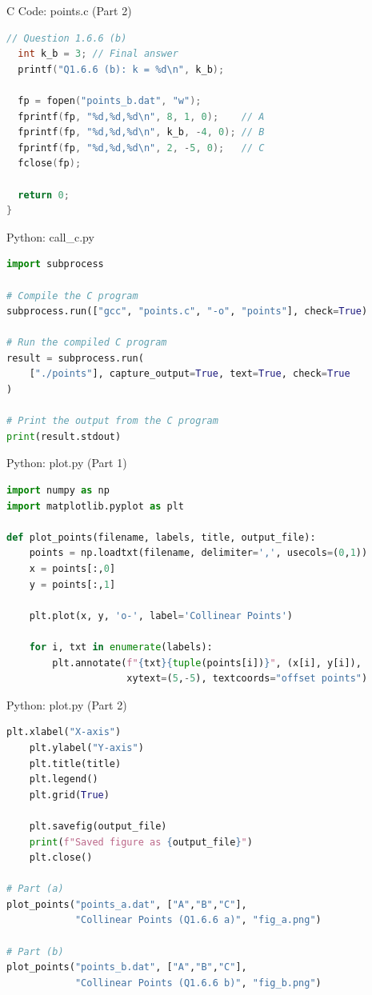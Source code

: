 \documentclass{beamer}
\numberwithin{equation}{section}
\theoremstyle{remark}
\begin{document}
\begin{frame}[fragile]{C Code: points.c (Part 2)}
\begin{lstlisting}[language=C]
  // Question 1.6.6 (b)
  int k_b = 3; // Final answer
  printf("Q1.6.6 (b): k = %d\n", k_b);

  fp = fopen("points_b.dat", "w");
  fprintf(fp, "%d,%d,%d\n", 8, 1, 0);    // A
  fprintf(fp, "%d,%d,%d\n", k_b, -4, 0); // B
  fprintf(fp, "%d,%d,%d\n", 2, -5, 0);   // C
  fclose(fp);

  return 0;
}
\end{lstlisting}
\end{frame}

\begin{frame}[fragile]{Python: call\_c.py}
\begin{lstlisting}[language=Python]
import subprocess

# Compile the C program
subprocess.run(["gcc", "points.c", "-o", "points"], check=True)

# Run the compiled C program
result = subprocess.run(
    ["./points"], capture_output=True, text=True, check=True
)

# Print the output from the C program
print(result.stdout)
\end{lstlisting}
\end{frame}

\begin{frame}[fragile]{Python: plot.py (Part 1)}
\begin{lstlisting}[language=Python]
import numpy as np
import matplotlib.pyplot as plt

def plot_points(filename, labels, title, output_file):
    points = np.loadtxt(filename, delimiter=',', usecols=(0,1))
    x = points[:,0]
    y = points[:,1]

    plt.plot(x, y, 'o-', label='Collinear Points')

    for i, txt in enumerate(labels):
        plt.annotate(f"{txt}{tuple(points[i])}", (x[i], y[i]),
                     xytext=(5,-5), textcoords="offset points")
\end{lstlisting}
\end{frame}

\begin{frame}[fragile]{Python: plot.py (Part 2)}
\begin{lstlisting}[language=Python]
    plt.xlabel("X-axis")
    plt.ylabel("Y-axis")
    plt.title(title)
    plt.legend()
    plt.grid(True)

    plt.savefig(output_file)
    print(f"Saved figure as {output_file}")
    plt.close()

# Part (a)
plot_points("points_a.dat", ["A","B","C"],
            "Collinear Points (Q1.6.6 a)", "fig_a.png")

# Part (b)
plot_points("points_b.dat", ["A","B","C"],
            "Collinear Points (Q1.6.6 b)", "fig_b.png")
\end{lstlisting}
\end{frame}
\end{document}
